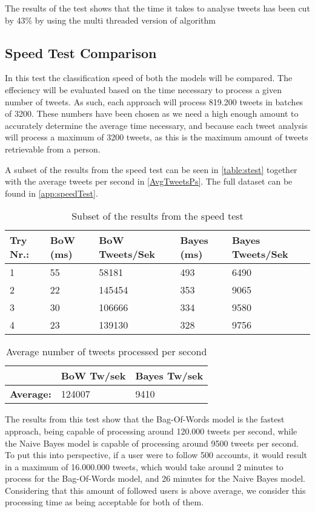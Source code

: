 The results of the test shows that the time it takes to analyse tweets has been
cut by 43\% by using the multi threaded version of algorithm 

\subsection{Speed Test Comparison}
In this test the classification speed of both the models will be compared. The
effeciency will be evaluated based on the time necessary to process a given
number of tweets. As such, each approach will process 819.200 tweets in batches
of 3200. These numbers have been chosen as we need a high enough amount to
accurately determine the average time necessary, and because each tweet
analysis will process a maximum of 3200 tweets, as this is the maximum amount
of tweets retrievable from a person.\nl

A subset of the results from the speed test can be seen in \autoref{table:stest}
together with the average tweets per second in \autoref{AvgTweetsPs}. The
full dataset can be found in \autoref{app:speedTest}.

\begin{table}[H]\centering
\begin{tabular}{|l|l|l|l|l|}
\hline
Try Nr.:	&	BoW (ms)	&	BoW Tweets/Sek	&	Bayes (ms)	&	Bayes Tweets/Sek	\\\hline
1	&	55	&	58181	&	493	&	6490 \\\hline
2	&	22	&	145454	&	353	&	9065 \\\hline
3	&	30	&	106666	&	334	&	9580 \\\hline
4	&	23	&	139130	&	328	&	9756 \\\hline		
\end{tabular}
\caption{Subset of the results from the speed test}
\label{table:stest}
\end{table}

\begin{table}[H]\centering
\begin{tabular}{|l|l|l|}\hline
					&	\textbf{BoW Tw/sek}	&	\textbf{Bayes Tw/sek}	\\\hline
\textbf{Average:}	&	124007				&	9410 					\\\hline	
\end{tabular}
\caption{Average number of tweets processed per second}
\label{AvgTweetsPs}
\end{table}

The results from this test show that the Bag-Of-Words model is the fastest
approach, being capable of processing around 120.000 tweets per second, while
the Naive Bayes model is capable of processing around 9500 tweets per second.
To put this into perspective, if a user were to follow 500 accounts, it would
result in a maximum of 16.000.000 tweets, which would take around 2 minutes to
process for the Bag-Of-Words model, and 26 minutes for the Naive Bayes model.
Considering that this amount of followed users is above average, we consider
this processing time as being acceptable for both of them.

